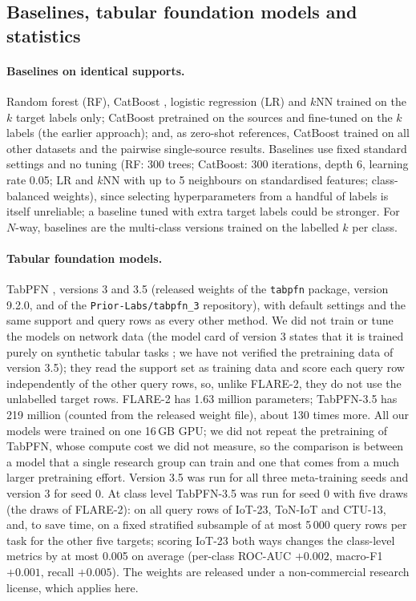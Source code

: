 \documentclass[pdflatex,sn-mathphys-num]{sn-jnl}%
\begin{document}
\subsection{Baselines, tabular foundation models and statistics}
\paragraph{Baselines on identical supports.}
Random forest (RF), CatBoost \citep{prokhorenkova2018catboost}, logistic regression (LR) and $k$NN trained on the $k$ target labels only; CatBoost pretrained on the sources and fine-tuned on the $k$ labels (the earlier approach); and, as zero-shot references, CatBoost trained on all other datasets and the pairwise single-source results.
Baselines use fixed standard settings and no tuning (RF: 300 trees; CatBoost: 300 iterations, depth 6, learning rate 0.05; LR and $k$NN with up to 5 neighbours on standardised features; class-balanced weights), since selecting hyperparameters from a handful of labels is itself unreliable; a baseline tuned with extra target labels could be stronger.
For $N$-way, baselines are the multi-class versions trained on the labelled $k$ per class.
\paragraph{Tabular foundation models.}
TabPFN \citep[the family of][]{hollmann2025tabpfn}, versions 3 and 3.5 (released weights of the \texttt{tabpfn} package, version 9.2.0, and of the \texttt{Prior-Labs/tabpfn\_3} repository), with default settings and the same support and query rows as every other method.
We did not train or tune the models on network data (the model card of version 3 states that it is trained purely on synthetic tabular tasks \citep{priorlabs2026tabpfn3}; we have not verified the pretraining data of version 3.5); they read the support set as training data and score each query row independently of the other query rows, so, unlike FLARE-2, they do not use the unlabelled target rows. FLARE-2 has 1.63 million parameters; TabPFN-3.5 has 219 million (counted from the released weight file), about 130 times more. All our models were trained on one 16\,GB GPU; we did not repeat the pretraining of TabPFN, whose compute cost we did not measure, so the comparison is between a model that a single research group can train and one that comes from a much larger pretraining effort.
Version 3.5 was run for all three meta-training seeds and version 3 for seed 0.
At class level TabPFN-3.5 was run for seed 0 with five draws (the draws of FLARE-2): on all query rows of IoT-23, ToN-IoT and CTU-13, and, to save time, on a fixed stratified subsample of at most 5\,000 query rows per task for the other five targets; scoring IoT-23 both ways changes the class-level metrics by at most 0.005 on average (per-class ROC-AUC $+0.002$, macro-F1 $+0.001$, recall $+0.005$).
The weights are released under a non-commercial research license, which applies here.
\end{document}

